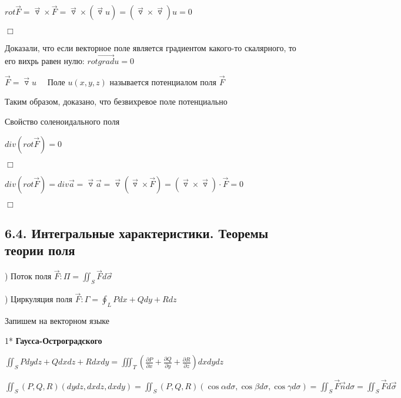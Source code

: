 \documentclass[12pt]{article}
\begin{document}
    $rot \overrightarrow{F} = \overrightarrow{\triangledown} \times \overrightarrow{F} = \overrightarrow{\triangledown} \times (\overrightarrow{\triangledown} u) = (\overrightarrow{\triangledown} \times \overrightarrow{\triangledown}) u = 0$

    $\Box$

    \Nota Доказали, что если векторное поле является градиентом какого-то скалярного, то его вихрь равен нулю: $rot \overrightarrow{grad} u = 0$

    \Def $\overrightarrow{F} = \overrightarrow{\triangledown} u \quad$ Поле $u(x, y, z)$ называется потенциалом поля $\overrightarrow{F}$

    Таким образом, доказано, что безвихревое поле потенциально

    \hypertarget{solenoidalfieldproperty}{}

     Свойство соленоидального поля

    $div (rot \overrightarrow{F}) = 0$

    $\Box$

    $div (rot \overrightarrow{F}) = div \overrightarrow{a} = \overrightarrow{\triangledown} \overrightarrow{a} = \overrightarrow{\triangledown} (\overrightarrow{\triangledown} \times \overrightarrow{F}) = (\overrightarrow{\triangledown} \times \overrightarrow{\triangledown}) \cdot \overrightarrow{F} = 0$

    $\Box$

    \hypertarget{integralcharacteristics}{}

    \subsection{6.4. Интегральные характеристики. Теоремы теории поля}

    ) Поток поля $\overrightarrow{F}: \Pi = \iint_S \overrightarrow{F}d\overrightarrow{\sigma}$

    ) Циркуляция поля $\overrightarrow{F}: \Gamma = \oint_L Pdx + Qdy + Rdz$

    \Nota Запишем \Ths на векторном языке

    \hypertarget{theoremGaussOstrogradskyyinvectorform}{}

    1* \textbf{Гаусса-Остроградского}

    $\iint_S Pdydz + Qdxdz + Rdxdy = \iiint_T \left(\frac{\partial P}{\partial x} + \frac{\partial Q}{\partial y} + \frac{\partial R}{\partial z}\right) dxdydz$

    $\iint_S (P, Q, R) (dydz, dxdz, dxdy) = \iint_S (P, Q, R) (\cos\alpha d\sigma, \cos\beta d\sigma, \cos\gamma d\sigma) =
    \iint_S \overrightarrow{F} \overrightarrow{n} d\sigma = \iint_S \overrightarrow{F} d\overrightarrow{\sigma}$
\end{document}
